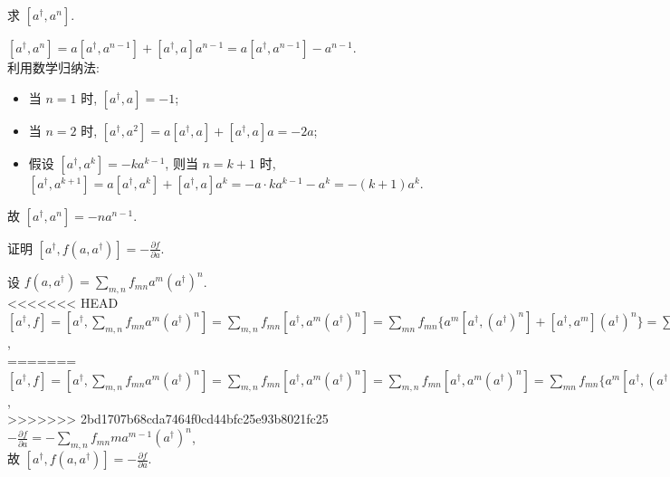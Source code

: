\documentclass{assignment}
\begin{document}
\begin{prob}
    求 $[a^{\dagger},a^n]$.
\end{prob}
\begin{sol}
    $[a^{\dagger},a^n]=a[a^{\dagger},a^{n-1}]+[a^{\dagger},a]a^{n-1}=a[a^{\dagger},a^{n-1}]-a^{n-1}$.\\
    利用数学归纳法:
    \begin{itemize}
        \item 当 $n=1$ 时, $[a^{\dagger},a]=-1$;
        \item 当 $n=2$ 时, $[a^{\dagger},a^2]=a[a^{\dagger},a]+[a^{\dagger},a]a=-2a$;
        \item 假设 $[a^{\dagger},a^k]=-ka^{k-1}$, 则当 $n=k+1$ 时, $[a^{\dagger},a^{k+1}]=a[a^{\dagger},a^k]+[a^{\dagger},a]a^k=-a\cdot ka^{k-1}-a^k=-(k+1)a^k$.
    \end{itemize}
    故 $[a^{\dagger},a^n]=-na^{n-1}$.
\end{sol}

\begin{prob}
    证明 $[a^{\dagger},f(a,a^{\dagger})]=-\frac{\partial f}{\partial a}$.
\end{prob}
\begin{pf}
    设 $f(a,a^{\dagger})=\sum_{m,n}f_{mn}a^m(a^{\dagger})^n$.\\
<<<<<<< HEAD
    $[a^{\dagger},f]=[a^{\dagger},\sum_{m,n}f_{mn}a^m(a^{\dagger})^n]=\sum_{m,n}f_{mn}[a^{\dagger},a^m(a^{\dagger})^n]=\sum_{mn}f_{mn}\{a^m[a^{\dagger},(a^{\dagger})^n]+[a^{\dagger},a^m](a^{\dagger})^n\}=\sum_{m,n}f_{mn}[a^{\dagger},a^n](a^{\dagger})^n=-\sum_{m,n}f_{mn}ma^{m-1}(a^{\dagger})^n$,\\
=======
    $[a^{\dagger},f]=[a^{\dagger},\sum_{m,n}f_{mn}a^m(a^{\dagger})^n]=\sum_{m,n}f_{mn}[a^{\dagger},a^m(a^{\dagger})^n]=\sum_{m,n}f_{mn}[a^{\dagger},a^m(a^{\dagger})^n]=\sum_{mn}f_{mn}\{a^m[a^{\dagger},(a^{\dagger})^n]+[a^{\dagger},a^m](a^{\dagger})^n\}=\sum_{m,n}f_{mn}[a^{\dagger},a^n](a^{\dagger})^n=-\sum_{m,n}f_{mn}ma^{m-1}(a^{\dagger})^n$,\\
>>>>>>> 2bd1707b68cda7464f0cd44bfc25e93b8021fc25
    $-\frac{\partial f}{\partial a}=-\sum_{m,n}f_{mn}ma^{m-1}(a^{\dagger})^n$,\\
    故 $[a^{\dagger},f(a,a^{\dagger})]=-\frac{\partial f}{\partial a}$.
\end{pf}
\end{document}
